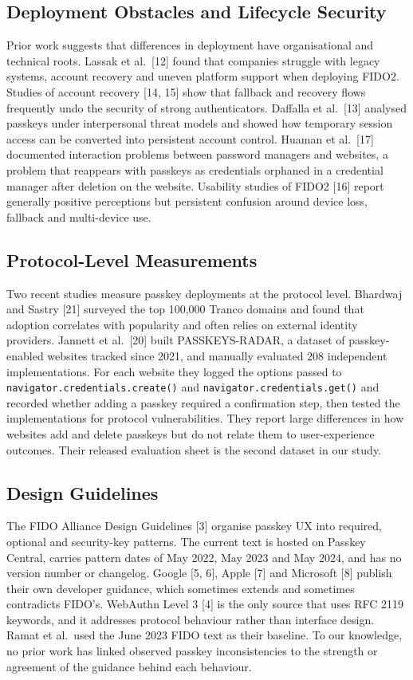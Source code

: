 \documentclass[letterpaper,twocolumn,10pt]{article}
\begin{document}
\subsection{Deployment Obstacles and Lifecycle Security}

Prior work suggests that differences in deployment have organisational and technical roots. Lassak et al.~{[}12{]} found that companies struggle with legacy systems, account recovery and uneven platform support when deploying FIDO2. Studies of account recovery {[}14, 15{]} show that fallback and recovery flows frequently undo the security of strong authenticators. Daffalla et al.~{[}13{]} analysed passkeys under interpersonal threat models and showed how temporary session access can be converted into persistent account control. Huaman et al.~{[}17{]} documented interaction problems between password managers and websites, a problem that reappears with passkeys as credentials orphaned in a credential manager after deletion on the website. Usability studies of FIDO2 {[}16{]} report generally positive perceptions but persistent confusion around device loss, fallback and multi-device use.

\subsection{Protocol-Level Measurements}

Two recent studies measure passkey deployments at the protocol level. Bhardwaj and Sastry {[}21{]} surveyed the top 100,000 Tranco domains and found that adoption correlates with popularity and often relies on external identity providers. Jannett et al.~{[}20{]} built PASSKEYS-RADAR, a dataset of passkey-enabled websites tracked since 2021, and manually evaluated 208 independent implementations. For each website they logged the options passed to \texttt{navigator.credentials.create()} and \texttt{navigator.credentials.get()} and recorded whether adding a passkey required a confirmation step, then tested the implementations for protocol vulnerabilities. They report large differences in how websites add and delete passkeys but do not relate them to user-experience outcomes. Their released evaluation sheet is the second dataset in our study.

\subsection{Design Guidelines}

The FIDO Alliance Design Guidelines {[}3{]} organise passkey UX into required, optional and security-key patterns. The current text is hosted on Passkey Central, carries pattern dates of May 2022, May 2023 and May 2024, and has no version number or changelog. Google {[}5, 6{]}, Apple {[}7{]} and Microsoft {[}8{]} publish their own developer guidance, which sometimes extends and sometimes contradicts FIDO's. WebAuthn Level 3 {[}4{]} is the only source that uses RFC 2119 keywords, and it addresses protocol behaviour rather than interface design. Ramat et al.~used the June 2023 FIDO text as their baseline. To our knowledge, no prior work has linked observed passkey inconsistencies to the strength or agreement of the guidance behind each behaviour.
\end{document}
